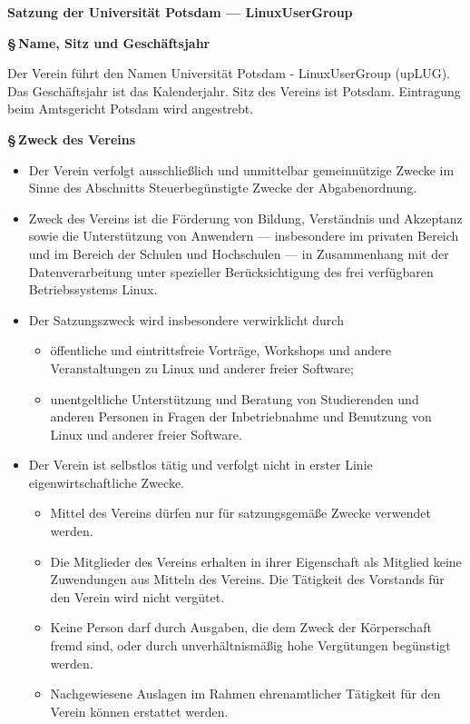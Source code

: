 \documentclass[11pt]{article}
\def\normalfont{\sffamily}
\def\items#1{{%
  \itcounter0%
  \begin{itemize}
  #1
  \end{itemize}
}}
\let\it\item%
\def\item{
  \advance\itcounter1%
  \it[(\the\itcounter)]
}
\def\paragraf#1{
  \advance\itcounter1%
  \par\medskip
  {\large\bfseries \S\,\the\itcounter\quad#1}
  \par\smallskip
}
\begin{document}
\normalfont
\fontsize{11pt}{8pt}\selectfont

\centerline{\Large\bfseries  Satzung der Universit{\"a}t Potsdam --- LinuxUserGroup}
\par
\bigskip

\paragraf{Name, Sitz und Gesch{\"a}ftsjahr}
\medskip

Der Verein f{\"u}hrt den Namen \glqq Universit{\"a}t Potsdam - LinuxUserGroup\grqq{} (upLUG).
Das Gesch{\"a}ftsjahr ist das Kalenderjahr.
Sitz des Vereins ist Potsdam.
Eintragung beim Amtsgericht Potsdam wird angestrebt.
%
%
\bigskip

\paragraf{Zweck des Vereins}

\items{
  \item
    Der Verein verfolgt ausschlie{\ss}lich und unmittelbar gemeinn{\"u}tzige Zwecke
    im Sinne des Abschnitts \glqq Steuerbeg{\"u}nstigte Zwecke\grqq{} der Abgabenordnung.
  \item
     Zweck des Vereins ist die F{\"o}rderung von Bildung, Verst{\"a}ndnis und
     Akzeptanz sowie die Unter\-st{\"u}tzung von Anwendern --- insbesondere im privaten Bereich
     und im Bereich der Schulen und Hochschulen --- in Zusammenhang mit der Datenverarbeitung
     unter spezieller Ber{\"u}cksichtigung des frei ver\-f{\"u}g\-baren Betriebssystems Linux.
   \item
     Der Satzungszweck wird insbesondere verwirklicht durch
      \items{
        \item
          {\"o}ffentliche und eintrittsfreie
          Vortr{\"a}ge, Workshops und andere Veranstaltungen zu Linux und anderer
          freier Software;
        \item
          unentgeltliche Unterst{\"u}tzung und Beratung von Studierenden und anderen Personen
          in Fragen der Inbetriebnahme und Benutzung von Linux und anderer freier Software.
      }
   \item
     Der Verein ist selbstlos t{\"a}tig und verfolgt nicht in erster Linie eigenwirtschaftliche Zwecke.
     \items{
       \item
         Mittel des Vereins d{\"u}rfen nur f{\"u}r satzungsgem{\"a}{\ss}e Zwecke verwendet werden.
       \item
         Die Mitglieder des Vereins erhalten in ihrer Eigenschaft als Mitglied
         keine Zuwendungen aus Mitteln des Vereins. Die T{\"a}tigkeit des Vorstands f{\"u}r den
         Verein wird nicht verg{\"u}tet.
       \item
         Keine Person darf durch Ausgaben, die dem Zweck der K{\"o}rperschaft fremd sind, oder durch
         unverh{\"a}ltnism{\"a}{\ss}ig hohe Verg{\"u}tungen beg{\"u}nstigt werden.
       \item
         Nachgewiesene Auslagen im Rahmen ehrenamtlicher T{\"a}tigkeit f{\"u}r den Verein
         k{\"o}nnen erstattet werden.
     }
}
\end{document}
